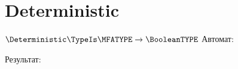 \section{Deterministic}
\begin{frame}{$\Deterministic\TypeIs\MFATYPE\to\BooleanTYPE$}
	Автомат:

	Результат:

\end{frame}